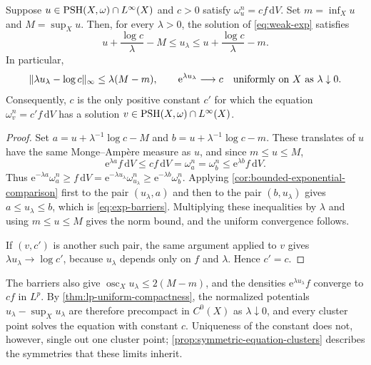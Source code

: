\begin{proposition}\label{prop:vanishing-exponent}\label{prop:classical-scalar-uniqueness}
Suppose $u\in\mathrm{PSH}(X,\omega)\cap L^\infty(X)$ and $c>0$ satisfy $\omega_u^n=cf\,\mathrm{d}V$. Set $m=\inf_Xu$ and $M=\sup_Xu$. Then, for every $\lambda>0$, the solution of \eqref{eq:weak-exp} satisfies
\begin{equation}\label{eq:exp-barriers}
 u+\frac{\log c}{\lambda}-M
 \leq u_\lambda\leq
 u+\frac{\log c}{\lambda}-m.
\end{equation}
In particular,
\[
 \|\lambda u_\lambda-\log c\|_\infty
 \leq\lambda(M-m),
 \qquad
 \mathrm{e}^{\lambda u_\lambda}\longrightarrow c
 \quad\hbox{uniformly on }X\hbox{ as }\lambda\downarrow0.
\]
Consequently, $c$ is the only positive constant $c'$ for which the equation $\omega_v^n=c'f\,\mathrm{d}V$ has a solution $v\in\mathrm{PSH}(X,\omega)\cap L^\infty(X)$.
\end{proposition}
\begin{proof}
Set $a=u+\lambda^{-1}\log c-M$ and $b=u+\lambda^{-1}\log c-m$. These translates of $u$ have the same Monge--Amp\`ere measure as $u$, and since $m\leq u\leq M$,
\[
 \mathrm{e}^{\lambda a}f\,\mathrm{d}V
 \leq cf\,\mathrm{d}V=\omega_a^n=\omega_b^n
 \leq\mathrm{e}^{\lambda b}f\,\mathrm{d}V.
\]
Thus $\mathrm{e}^{-\lambda a}\omega_a^n\geq f\,\mathrm{d}V=\mathrm{e}^{-\lambda u_\lambda}\omega_{u_\lambda}^n\geq\mathrm{e}^{-\lambda b}\omega_b^n$. Applying \cref{cor:bounded-exponential-comparison} first to the pair $(u_\lambda,a)$ and then to the pair $(b,u_\lambda)$ gives $a\leq u_\lambda\leq b$, which is \eqref{eq:exp-barriers}. Multiplying these inequalities by $\lambda$ and using $m\leq u\leq M$ gives the norm bound, and the uniform convergence follows.

If $(v,c')$ is another such pair, the same argument applied to $v$ gives $\lambda u_\lambda\to\log c'$, because $u_\lambda$ depends only on $f$ and $\lambda$. Hence $c'=c$.
\end{proof}

The barriers also give $\operatorname{osc}_Xu_\lambda\leq2(M-m)$, and the densities $\mathrm{e}^{\lambda u_\lambda}f$ converge to $cf$ in $L^p$. By \cref{thm:lp-uniform-compactness}, the normalized potentials $u_\lambda-\sup_Xu_\lambda$ are therefore precompact in $C^0(X)$ as $\lambda\downarrow0$, and every cluster point solves the equation with constant $c$. Uniqueness of the constant does not, however, single out one cluster point; \cref{prop:symmetric-equation-clusters} describes the symmetries that these limits inherit.

